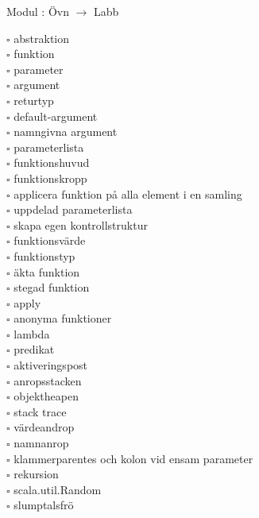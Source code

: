 
    Modul : Övn  $\rightarrow$ Labb 
    \begin{multicols}{3}\SlideFontTiny
    $\square$ abstraktion \\
$\square$ funktion \\
$\square$ parameter \\
$\square$ argument \\
$\square$ returtyp \\
$\square$ default-argument \\
$\square$ namngivna argument \\
$\square$ parameterlista \\
$\square$ funktionshuvud \\
$\square$ funktionskropp \\
$\square$ applicera funktion på alla element i en samling \\
$\square$ uppdelad parameterlista \\
$\square$ skapa egen kontrollstruktur \\
$\square$ funktionsvärde \\
$\square$ funktionstyp \\
$\square$ äkta funktion \\
$\square$ stegad funktion \\
$\square$ apply \\
$\square$ anonyma funktioner \\
$\square$ lambda \\
$\square$ predikat \\
$\square$ aktiveringspost \\
$\square$ anropsstacken \\
$\square$ objektheapen \\
$\square$ stack trace \\
$\square$ värdeandrop \\
$\square$ namnanrop \\
$\square$ klammerparentes och kolon vid ensam parameter \\
$\square$ rekursion \\
$\square$ scala.util.Random \\
$\square$ slumptalsfrö \\
    \end{multicols}
    